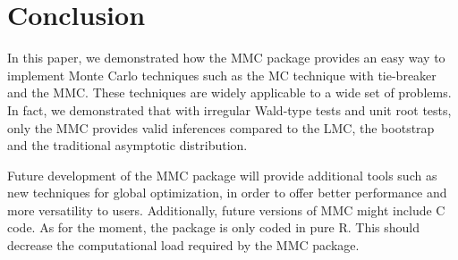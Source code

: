 \documentclass[11pt]{article}\usepackage[]{graphicx}\usepackage[]{color}
\newcommand{\pkg}[1]{{\normalfont\fontseries{b}\selectfont #1}}
\let\proglang=\textsf
\begin{document}
\section{Conclusion}

In this paper, we demonstrated how the \pkg{MMC} package provides an easy way to implement Monte Carlo techniques such as the MC technique with tie-breaker and the MMC. These techniques are widely applicable to a wide set of problems. In fact, we demonstrated that with irregular Wald-type tests and unit root tests, only the MMC provides valid inferences compared to the LMC, the bootstrap and the traditional asymptotic distribution.

Future development of the \pkg{MMC} package will provide additional tools such as new techniques for global optimization, in order to offer better performance and more versatility to users. Additionally, future versions of \pkg{MMC} might include \proglang{C} code. As for the moment, the package is only coded in pure \proglang{R}. This should decrease the computational load required by the \pkg{MMC} package.


\clearpage

\printbibliography
\end{document}
